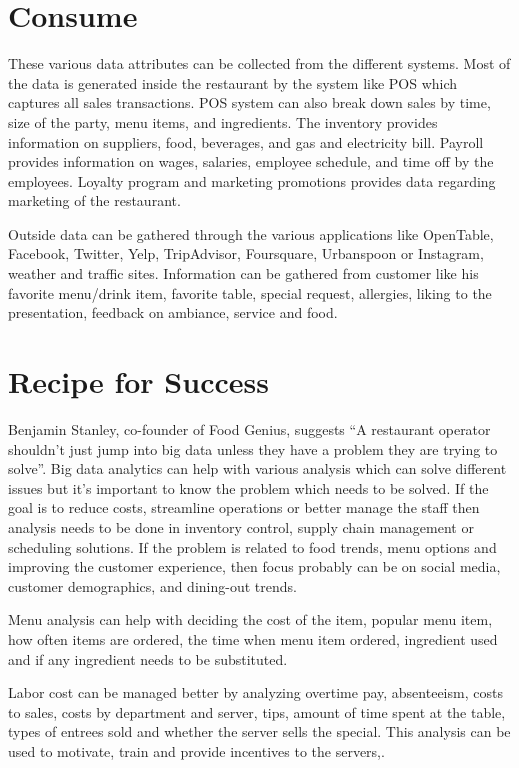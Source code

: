 \documentclass[sigconf]{acmart}
\begin{document}
\section{Consume}
These various data attributes can be collected from the different systems. Most of the data is generated inside the restaurant by the system like POS which captures all sales transactions. POS system can also break down sales by time, size of the party, menu items, and ingredients. The inventory provides information on suppliers, food, beverages, and gas and electricity bill. Payroll provides information on wages, salaries, employee schedule, and time off by the employees. Loyalty program and marketing promotions provides data regarding marketing of the restaurant.


Outside data can be gathered through the various applications like OpenTable, Facebook, Twitter, Yelp, TripAdvisor, Foursquare, Urbanspoon or Instagram, weather and traffic sites. Information can be gathered from customer like his favorite menu/drink item, favorite table, special request, allergies, liking to the presentation, feedback on ambiance, service and food\cite{www-restaurant}. 

\section{Recipe for Success}
Benjamin Stanley, co-founder of Food Genius, suggests ``A restaurant operator shouldn't just jump into big data unless they have a problem they are trying to solve''\cite{KooserAmandaC.2013BD}. Big data analytics can help with various analysis which can solve different issues but it's important to know the problem which needs to be solved. If the goal is to reduce costs, streamline operations or better manage the staff then analysis needs to be done in inventory control, supply chain management or scheduling solutions. If the problem is related to food trends, menu options and improving the customer experience, then focus probably can be on social media, customer demographics, and dining-out trends\cite{www-restaurant}.
 

Menu analysis can help with deciding the cost of the item, popular menu item, how often items are ordered, the time when menu item ordered, ingredient used and if any ingredient needs to be substituted\cite{KooserAmandaC.2013BD}.

Labor cost can be managed better by analyzing overtime pay, absenteeism, costs to sales, costs by department and server, tips, amount of time spent at the table, types of entrees sold and whether the server sells the special. This analysis can be used to motivate, train and provide incentives to the servers\cite{www-restaurant},\cite{KooserAmandaC.2013BD}. 
\end{document}
